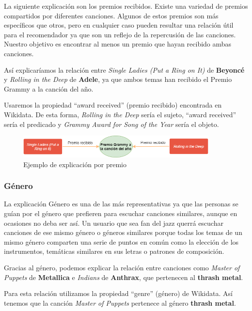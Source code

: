 La siguiente explicación son los premios recibidos. Existe una variedad de premios compartidos por diferentes canciones. Algunos de estos premios son más específicos que otros, pero en cualquier caso pueden resultar una relación útil para el recomendador ya que son un reflejo de la repercusión de las canciones. Nuestro objetivo es encontrar al menos un premio que hayan recibido ambas canciones.

Así explicaríamos la relación entre \textit{Single Ladies (Put a Ring on It)} de \textbf{Beyoncé} y \textit{Rolling in the Deep} de \textbf{Adele}, ya que ambos temas han recibido el Premio Grammy a la canción del año.

Usaremos la propiedad ``award received'' (premio recibido) encontrada en Wikidata. De esta forma, \textit{Rolling in the Deep} sería el sujeto, ``award received'' sería el predicado y \textit{Grammy Award for Song of the Year} sería el objeto.\\

\begin{figure}[h!]
	\centering
	\includegraphics[width = 0.9\textwidth]{Imagenes/Bitmap/Premio ejemplo.png}
	\caption{Ejemplo de explicación por premio}
	\label{fig:sampleImage}
\end{figure}

\subsubsection*{Género}

La explicación Género es una de las más representativas ya que las personas se guían por el género que prefieren para escuchar canciones similares, aunque en ocasiones no deba ser así. Un usuario que sea fan del jazz querrá escuchar canciones de ese mismo género o géneros similares porque todas los temas de un mismo género comparten una serie de puntos en común como la elección de los instrumentos, temáticas similares en sus letras o patrones de composición.

Gracias al género, podemos explicar la relación entre canciones como \textit{Master of Puppets} de \textbf{Metallica} e \textit{Indians} de \textbf{Anthrax}, que pertenecen al \textbf{thrash metal}.

Para esta relación utilizamos la propiedad ``genre'' (género) de Wikidata. Así tenemos que la canción \textit{Master of Puppets} pertenece al género \textbf{thrash metal}.\\

